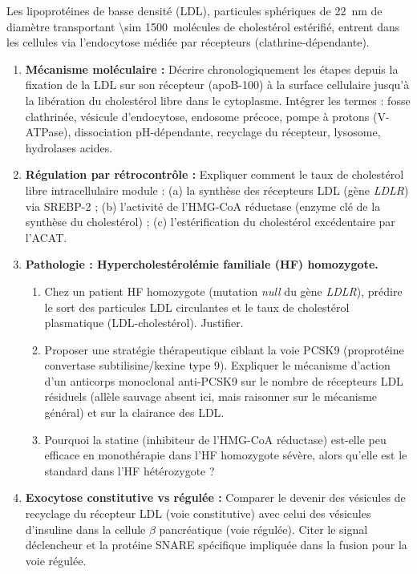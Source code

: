 \documentclass[11pt]{article}
\begin{document}
\begin{exercice}
Les lipoprotéines de basse densité (LDL), particules sphériques de \SI{22}{nm} de diamètre transportant \SI{\sim 1500}{molécules} de cholestérol estérifié, entrent dans les cellules via l'endocytose médiée par récepteurs (clathrine-dépendante).
\begin{enumerate}
    \item \textbf{Mécanisme moléculaire :} Décrire chronologiquement les étapes depuis la fixation de la LDL sur son récepteur (apoB-100) à la surface cellulaire jusqu'à la libération du cholestérol libre dans le cytoplasme. Intégrer les termes : fosse clathrinée, vésicule d'endocytose, endosome précoce, pompe à protons (V-ATPase), dissociation pH-dépendante, recyclage du récepteur, lysosome, hydrolases acides.
    \item \textbf{Régulation par rétrocontrôle :} Expliquer comment le taux de cholestérol libre intracellulaire module : (a) la synthèse des récepteurs LDL (gène \textit{LDLR}) via SREBP-2 ; (b) l'activité de l'HMG-CoA réductase (enzyme clé de la synthèse du cholestérol) ; (c) l'estérification du cholestérol excédentaire par l'ACAT.
    \item \textbf{Pathologie : Hypercholestérolémie familiale (HF) homozygote.} 
    \begin{enumerate}
        \item Chez un patient HF homozygote (mutation \textit{null} du gène \textit{LDLR}), prédire le sort des particules LDL circulantes et le taux de cholestérol plasmatique (LDL-cholestérol). Justifier.
        \item Proposer une stratégie thérapeutique ciblant la voie PCSK9 (proprotéine convertase subtilisine/kexine type 9). Expliquer le mécanisme d'action d'un anticorps monoclonal anti-PCSK9 sur le nombre de récepteurs LDL résiduels (allèle sauvage absent ici, mais raisonner sur le mécanisme général) et sur la clairance des LDL.
        \item Pourquoi la statine (inhibiteur de l'HMG-CoA réductase) est-elle peu efficace en monothérapie dans l'HF homozygote sévère, alors qu'elle est le standard dans l'HF hétérozygote ?
    \end{enumerate}
    \item \textbf{Exocytose constitutive vs régulée :} Comparer le devenir des vésicules de recyclage du récepteur LDL (voie constitutive) avec celui des vésicules d'insuline dans la cellule $\beta$ pancréatique (voie régulée). Citer le signal déclencheur et la protéine SNARE spécifique impliquée dans la fusion pour la voie régulée.
\end{enumerate}
\end{exercice}
\end{document}
